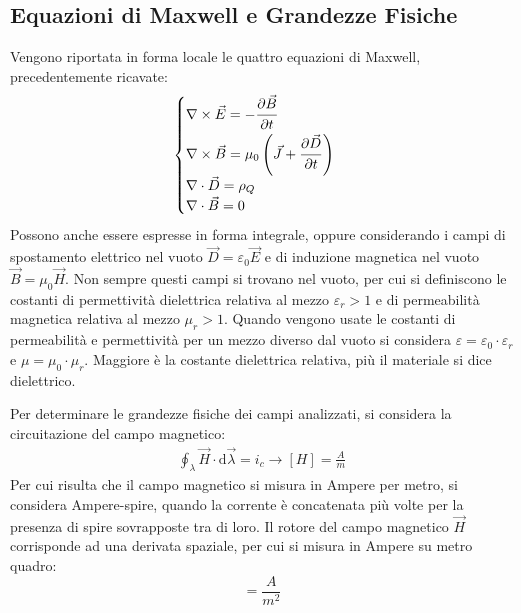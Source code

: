 \documentclass{article}
\newcommand{\df}{\mathrm{d}}
\numberwithin{equation}{subsection}
\begin{document}
\subsection{Equazioni di Maxwell e Grandezze Fisiche}

Vengono riportata in forma locale le quattro equazioni di Maxwell, precedentemente ricavate:
\begin{equation*}
    \begin{cases}
        \nabla\times\vec{E}=-\displaystyle\frac{\strut \partial \vec{B}}{\strut \partial t}\\
        \nabla\times\vec{B}=\mu_0\left(\vec{J}+\displaystyle\frac{\strut \partial \vec{D}}{\strut \partial t}\right)\\
        \nabla\cdot\vec{D}=\rho_Q\\
        \nabla\cdot\vec{B}=0
    \end{cases}
\end{equation*}
Possono anche essere espresse in forma integrale, oppure considerando i campi di spostamento elettrico nel vuoto $\vec{D}=\varepsilon_0\vec{E}$ e di induzione magnetica nel 
vuoto $\vec{B}=\mu_0\vec{H}$. Non sempre questi campi si trovano nel vuoto, per cui si definiscono le costanti di permettività dielettrica relativa al mezzo $\varepsilon_r>1$ 
e di permeabilità magnetica relativa al mezzo $\mu_r>1$. Quando vengono usate le costanti di permeabilità e permettività per un mezzo diverso dal vuoto si considera $\varepsilon=\varepsilon_0\cdot\varepsilon_r$ 
e $\mu=\mu_0\cdot\mu_r$. Maggiore è la costante dielettrica relativa, più il materiale si dice dielettrico. 

Per determinare le grandezze fisiche dei campi analizzati, si considera la circuitazione del campo magnetico:
\begin{gather*}
    \displaystyle\oint_{\lambda}\vec{H}\cdot \df\vec{\lambda}=i_c\to[H]=\displaystyle\frac{A}{m}
\end{gather*}
Per cui risulta che il campo magnetico si misura in Ampere per 
metro, si considera Ampere-spire, quando la corrente è concatenata più volte per la presenza di spire sovrapposte tra di loro. Il rotore del campo magnetico $\vec{H}$ 
corrisponde ad una derivata spaziale, per cui si misura in Ampere su metro quadro:
\begin{equation*}
    [\nabla\times\vec{H}]=\displaystyle\frac{A}{m^2}
\end{equation*}
\end{document}
